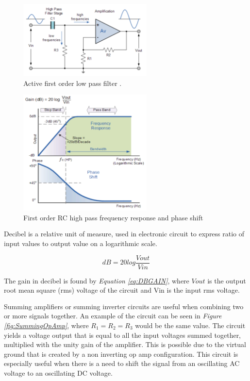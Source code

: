 \begin{figure}[h]
    \centering
    \includegraphics[width=0.60\textwidth]{graphics/highPassFilter.png}
    \caption{Active first order low pass filter \cite{noauthor_active_2013}.}
    \label{fig:HighPassFiler}
\end{figure}

\begin{figure}[h]
    \centering
    \includegraphics[width=0.60\textwidth]{graphics/highPassResponse.png}
    \caption{First order RC high pass frequency response and phase shift \cite{noauthor_high_2013}}
    \label{fig:HighPassResponse}
\end{figure}

\clearpage

Decibel is a relative unit of measure, used in electronic circuit to express ratio of input values to output value on a logarithmic scale.  

\begin{equation}
    dB = 20log\frac{V{out}}{V{in}}
    \label{eq:DBGAIN}
\end{equation}

The gain in decibel is found by \textit{Equation \ref{eq:DBGAIN}}, where $V{out}$ is the output root mean square (rms) voltage of the circuit and V{in} is the input rms voltage.

Summing amplifiers or summing inverter circuits are useful when combining two or more signals together.
An example of the circuit can be seen in \textit{Figure \ref{fig:SummingOpAmp}}, where $R_1 = R_2 = R_3$ would be the same value.
The circuit yields a voltage output that is equal to all the input voltages summed together, multiplied with the unity gain of the amplifier.
This is possible due to the virtual ground that is created by a non inverting op amp configuration\cite{noauthor_summing_2013}. 
This circuit is especially useful when there is a need to shift the signal from an oscillating AC voltage to an oscillating DC voltage.


